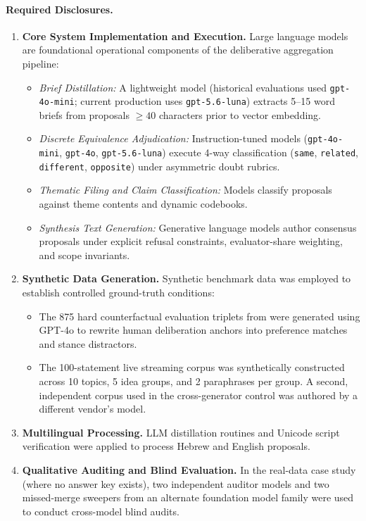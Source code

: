 \documentclass{article}
\begin{document}
\paragraph{Required Disclosures.}
\begin{enumerate}
\item \textbf{Core System Implementation and Execution.} Large language models are foundational operational components of the deliberative aggregation pipeline:
\begin{itemize}
\item \emph{Brief Distillation:} A lightweight model (historical evaluations used \texttt{gpt-4o-mini}; current production uses \texttt{gpt-5.6-luna}) extracts 5--15 word briefs from proposals $\geq 40$ characters prior to vector embedding.
\item \emph{Discrete Equivalence Adjudication:} Instruction-tuned models (\texttt{gpt-4o-mini}, \texttt{gpt-4o}, \texttt{gpt-5.6-luna}) execute 4-way classification (\texttt{same}, \texttt{related}, \texttt{different}, \texttt{opposite}) under asymmetric doubt rubrics.
\item \emph{Thematic Filing and Claim Classification:} Models classify proposals against theme contents and dynamic codebooks.
\item \emph{Synthesis Text Generation:} Generative language models author consensus proposals under explicit refusal constraints, evaluator-share weighting, and scope invariants.
\end{itemize}
\item \textbf{Synthetic Data Generation.} Synthetic benchmark data was employed to establish controlled ground-truth conditions:
\begin{itemize}
\item The 875 hard counterfactual evaluation triplets from \citet{blair2026embeddings} were generated using GPT-4o to rewrite human deliberation anchors into preference matches and stance distractors.
\item The 100-statement live streaming corpus was synthetically constructed across 10 topics, 5 idea groups, and 2 paraphrases per group. A second, independent corpus used in the cross-generator control was authored by a different vendor's model.
\end{itemize}
\item \textbf{Multilingual Processing.} LLM distillation routines and Unicode script verification were applied to process Hebrew and English proposals.
\item \textbf{Qualitative Auditing and Blind Evaluation.} In the real-data case study (where no answer key exists), two independent auditor models and two missed-merge sweepers from an alternate foundation model family were used to conduct cross-model blind audits.
\end{enumerate}
\end{document}
